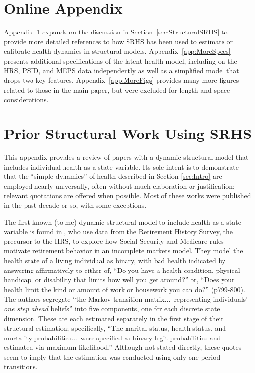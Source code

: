 \documentclass[12pt,pdftex,letterpaper]{article}
\begin{document}
\setcounter{table}{3}

\setcounter{figure}{9}

\appendix

\section*{Online Appendix}

Appendix~\ref{app:LitQuotes} expands on the discussion in Section~\ref{sec:StructuralSRHS} to provide more detailed references to how SRHS has been used to estimate or calibrate health dynamics in structural models. Appendix~\ref{app:MoreSpecs} presents additional specifications of the latent health model, including on the HRS, PSID, and MEPS data independently as well as a simplified model that drops two key features. Appendix~\ref{app:MoreFigs} provides many more figures related to those in the main paper, but were excluded for length and space considerations.


\section{Prior Structural Work Using SRHS}\label{app:LitQuotes}

This appendix provides a review of papers with a dynamic structural model that includes individual health as a state variable.  Its sole intent is to demonstrate that the ``simple dynamics'' of health described in Section \ref{sec:Intro} are employed nearly universally, often without much elaboration or justification; relevant quotations are offered when possible.  Most of these works were published in the past decade or so, with some exceptions.

The first known (to me) dynamic structural model to include health as a state variable is found in \cite{RustPhelan97}, who use data from the Retirement History Survey, the precursor to the HRS, to explore how Social Security and Medicare rules motivate retirement behavior in an incomplete markets model.  They model the health state of a living individual as binary, with bad health indicated by answering affirmatively to either of, ``Do you have a health condition, physical handicap, or disability that limits how well you get around?'' or, ``Does your health limit the kind or amount of work or housework you can do?'' (p799-800).  The authors segregate ``the Markov transition matrix...\ representing individuals' \textit{one step ahead} beliefs'' into five components, one for each discrete state dimension.  These are each estimated separately in the first stage of their structural estimation; specifically, ``The marital status, health status, and mortality probabilities...\ were specified as binary logit probabilities and estimated via maximum likelihood.''  Although not stated directly, these quotes seem to imply that the estimation was conducted using only one-period transitions.
\end{document}
